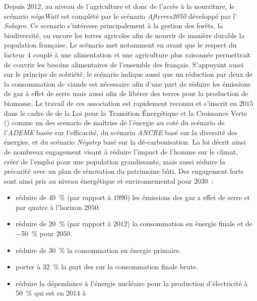 Depuis $2012$, au niveau de l’agriculture et donc de l’accès à la nourriture, le scénario \textit{négaWatt}
est complété par le scénario \textit{Afterres2050} développé par l’ \textit{Solagro}. Ce
scenario s’intéresse principalement à la gestion des forêts, la biodiversité, ou encore
les terres agricoles afin de nourrir de manière durable la population française.
Le scénario met notamment en avant que le respect du facteur $4$ couplé à une alimentation
et une agriculture plus raisonnée permettrait de couvrir les besoins alimentaires
de l’ensemble des français. S’appuyant aussi sur le principe de sobriété, le scénario
indique aussi que un réduction par deux de la consommation de viande est
nécessaire afin d’une part de réduire les émissions de gaz à effet de serre mais
aussi afin de libérer des terres pour la production de biomasse.
Le travail de ces association est rapidement reconnu et s’inscrit en $2015$ dans le cadre de
de la Loi pour la Transition Énergétique et la Croissance Verte
()
comme un des scenario de maîtrise de l’énergie au coté du scénario de l’\textit{ADEME}
basée sur l’efficacité, du scénario \textit{ANCRE} basé sur la diversité des énergies, et du scénario \textit{Négatep}
basé sur la dé-carbonisation.
La loi décrit ainsi de nombreux engagement visant à réduire l’impact de l’homme sur le
climat, créer de l’emploi pour une population grandissante, mais aussi réduire la précarité
avec un plan de rénovation du patrimoine bâti. Des engagement forts sont ainsi pris au
niveau énergétique et environnemental pour $2030$~:
\begin{itemize}
    \item réduire de \SI{40}{\percent} (par rapport à $1990$) les émissions des gaz a
          effet de serre et par quatre à l’horizon $2050$.
    \item réduire de \SI{20}{\percent} (par rapport à $2012$) la consommation en énergie
          finale et de \SI{-50}{\percent} pour $2050$.
    \item réduire de \SI{30}{\percent} la consommation en énergie primaire.
    \item porter à \SI{32}{\percent} la part des  sur la consommation finale brute.
    \item réduire la dépendance à l’énergie nucléaire pour la production d’électricité à
          \SI{50}{\percent} qui est en $2014$ à 
\end{itemize}





